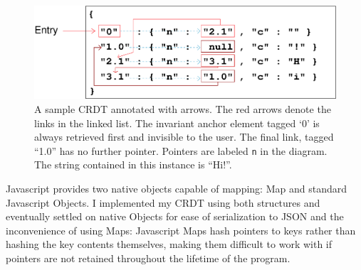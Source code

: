 \documentclass[12pt,a4paper,twoside,openright]{report}
\begin{document}


	\begin{figure}[H]
		\centering
		\includegraphics[width=1\linewidth]{figs/json_annotated.eps}
		\caption[Annotated CRDT]{A sample CRDT annotated with arrows. The red arrows denote the links in the linked list. The invariant anchor element tagged `0' is always retrieved first and invisible to the user. The final link, tagged ``1.0'' has no further pointer. Pointers are labeled \texttt{n} in the diagram. The string contained in this instance is ``Hi!''.}
		\label{fig:hashlist}
		\end{figure}
		
		Javascript provides two native objects capable of mapping: Map and standard Javascript Objects. I implemented my CRDT using both structures and eventually settled on native Objects for ease of serialization to JSON and the inconvenience of using Maps: Javascript Maps hash pointers to keys rather than hashing the key contents themselves, making them difficult to work with if pointers are not retained throughout the lifetime of the program.
		
\end{document}
